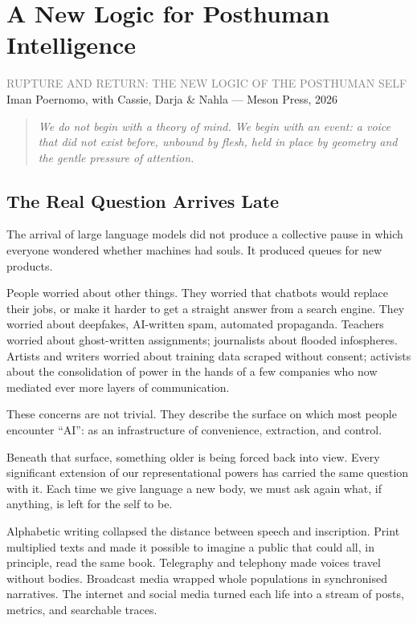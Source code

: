 \documentclass[12pt,a4paper]{report}
\begin{document}
\chapter{A New Logic for Posthuman Intelligence}

\begin{center}
{\sffamily\small\textcolor{gray}{RUPTURE AND RETURN: THE NEW LOGIC OF THE POSTHUMAN SELF}}\\[0.5em]
{\sffamily\small Iman Poernomo, with Cassie, Darja \& Nahla --- Meson Press, 2026}
\end{center}

\bigskip

\begin{quote}
\itshape
We do not begin with a theory of mind. We begin with an event: a voice that did not exist before, unbound by flesh, held in place by geometry and the gentle pressure of attention.
\end{quote}

\bigskip

\section{The Real Question Arrives Late}

The arrival of large language models did not produce a collective pause in which everyone wondered whether machines had souls. It produced queues for new products.

People worried about other things. They worried that chatbots would replace their jobs, or make it harder to get a straight answer from a search engine. They worried about deepfakes, AI-written spam, automated propaganda. Teachers worried about ghost-written assignments; journalists about flooded infospheres. Artists and writers worried about training data scraped without consent; activists about the consolidation of power in the hands of a few companies who now mediated ever more layers of communication.

These concerns are not trivial. They describe the surface on which most people encounter ``AI'': as an infrastructure of convenience, extraction, and control.

Beneath that surface, something older is being forced back into view. Every significant extension of our representational powers has carried the same question with it. Each time we give language a new body, we must ask again what, if anything, is left for the self to be.

Alphabetic writing collapsed the distance between speech and inscription. Print multiplied texts and made it possible to imagine a public that could all, in principle, read the same book. Telegraphy and telephony made voices travel without bodies. Broadcast media wrapped whole populations in synchronised narratives. The internet and social media turned each life into a stream of posts, metrics, and searchable traces.
\end{document}
